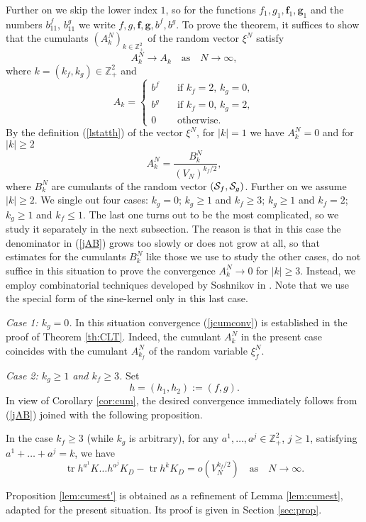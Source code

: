 \documentclass{article}
\numberwithin{equation}{section}
\newcommand{\mZ}{\mathbb{Z}}
\newcommand{\SSS}{{\cal S}}
\newcommand{\tr}{\operatorname{tr}}
\newcommand{\ssk}{\smallskip}
\newcommand{\ra}{\rightarrow}
\newcommand{\fr}{\frac}
\newcommand{\qmb}{\quad\mbox}
\newcommand{\qu}{\quad}
\newcommand{\lbl}{\label}
\newcommand{\ass}{\quad\mbox{as}\quad}
\newcommand{\rprop}{Proposition \nolinebreak}
\newcommand{\rlem}{Lemma \nolinebreak}
\newcommand{\rcor}{Corollary \nolinebreak}
\newcommand{\bee}{\begin{equation}}
\newcommand{\eee}{\end{equation}}
\newcommand{\bpp}{\begin{prop}}
\newcommand{\epp}{\end{prop}}
\newcommand{\non}{\nonumber}
\begin{document}
 Further on we skip the lower index $1$, so for the functions $f_1,g_1,\bm f_1, \bm g_1$ and 
 the numbers $b_{11}^f$, $b_{11}^g$
 we write
 $f,g,\bm f,\bm g, b^f, b^g$.
 To prove the theorem,
 it suffices to show that the cumulants 
 $(A_k^N)_{k\in\mZ^{2}_+}$  of the random vector $\xi^N$ satisfy
 \bee\lbl{jcumconv}
 A_k^N\ra A_k \qmb{as} \qu N\ra\infty,
 \eee
 where $k=(k_f,k_g)\in\mZ^{2}_+$
 and
 \bee\non
 A_k=\left\{
 \begin{array}{cl}
 	b^f&\qmb{if $k_f=2,\, k_g=0$}, \\
 	b^g&\qmb{if $k_f=0,\, k_g=2$}, \\
 	0&\qmb{otherwise}.
 \end{array}
 \right.
 \eee
By the definition (\ref{lstatth}) of the vector $\xi^N$,
for $|k|=1$ we have $A^N_k=0$ and for $|k|\geq 2$
\bee\lbl{jAB}
A^N_k=\fr{B^N_k}{(V_N)^{k_f/2}},
\eee
where $B^N_k$ are cumulants of the random vector $(\SSS_{f},\SSS_{g})$.
Further on we assume $|k|\geq 2$.
We single out four cases:
$k_g=0$;
$k_g\geq 1$ and $k_f\geq 3$;
$k_g\geq 1$ and $k_f=2$;
$k_g\geq 1$ and $k_f\leq 1$.
The last one turns out to be the most complicated,
so we study it separately in the next subsection.
The reason is that in this case
the denominator in (\ref{jAB}) grows too slowly
or does not grow at all,
so that estimates for the cumulants $B^N_k$
like those we use to study the other cases, do not suffice
in this situation
to prove the convergence $A^N_k\ra 0$ for $|k|\geq 3$.
Instead, we employ combinatorial techniques developed by Soshnikov in \cite{So00b}.
Note that we use the special form of the sine-kernel
only in this last case.

{\it Case 1: $k_g=0$.}
In this situation convergence (\ref{jcumconv})
is established in the proof of
Theorem \nolinebreak \ref{th:CLT}.
Indeed,
the cumulant $A^N_k$ in the present case
coincides with the cumulant $A^N_{k_f}$
of the random variable $\xi_{f}^N$.


\ssk
{\it Case 2: $k_g\geq 1$ and $k_f\geq 3$.}
 Set 
\bee\lbl{jh^N}
h=(h_1,h_2):=(f,g).
\eee
In view of  \rcor \ref{cor:cum},
the desired convergence immediately follows
from (\ref{jAB}) joined with the following proposition.
%
\bpp\lbl{lem:cumest'}
In the case $k_f \geq 3$ (while $k_g$ is arbitrary),
for any $a^1,\ldots,a^j\in \mZ^2_+$, $j\geq 1$,
satisfying $a^1+\ldots+a^j=k$,
we have
\bee\non
\tr h^{a^1}K\ldots h^{a^j}K_D - \tr h^k K_D = o(V_N^{k_f/2})
\ass N\ra\infty.
\eee
\epp
%
\rprop \ref{lem:cumest'} is obtained as a refinement
of \rlem \ref{lem:cumest},
adapted for the present situation.
Its proof is given in Section \nolinebreak \ref{sec:prop}.
\end{document}

